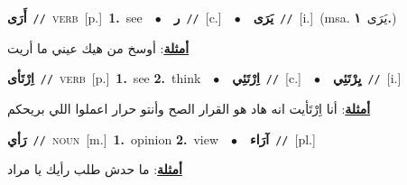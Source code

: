 \documentclass[10pt,a4paper,twoside]{article} %
\begin{document}
\begin{multicols}{2}
{\setlength\topsep{0pt}\textbf{\foreignlanguage{arabic}{أَرَى}}\ {\color{gray}\texttt{//}\color{black}}\ \textsc{verb}\ [p.]\ \textbf{1.}~see\ \ $\bullet$\ \ \setlength\topsep{0pt}\textbf{\foreignlanguage{arabic}{ر}}\ {\color{gray}\texttt{//}\color{black}}\ [c.]\ \ $\bullet$\ \ \setlength\topsep{0pt}\textbf{\foreignlanguage{arabic}{يَرَى}}\ {\color{gray}\texttt{//}\color{black}}\ [i.]\ \color{gray}(msa. \foreignlanguage{arabic}{يَرَى}~\foreignlanguage{arabic}{\textbf{١.}})\color{black}\  \begin{flushright}\color{gray}\foreignlanguage{arabic}{\textbf{\underline{\foreignlanguage{arabic}{أمثلة}}}: أوسخ من هيك عيني ما أريت}\end{flushright}\color{black}} \vspace{2mm}

{\setlength\topsep{0pt}\textbf{\foreignlanguage{arabic}{اِرْتَأى}}\ {\color{gray}\texttt{//}\color{black}}\ \textsc{verb}\ [p.]\ \textbf{1.}~see  \textbf{2.}~think\ \ $\bullet$\ \ \setlength\topsep{0pt}\textbf{\foreignlanguage{arabic}{اِرْتَئِي}}\ {\color{gray}\texttt{//}\color{black}}\ [c.]\ \ $\bullet$\ \ \setlength\topsep{0pt}\textbf{\foreignlanguage{arabic}{يِرْتَئِي}}\ {\color{gray}\texttt{//}\color{black}}\ [i.]\  \begin{flushright}\color{gray}\foreignlanguage{arabic}{\textbf{\underline{\foreignlanguage{arabic}{أمثلة}}}: أنا اِرْتَأيت انه هاد هو القرار الصح وأنتو حرار اعملوا اللي بريحكم}\end{flushright}\color{black}} \vspace{2mm}

{\setlength\topsep{0pt}\textbf{\foreignlanguage{arabic}{رَأي}}\ {\color{gray}\texttt{//}\color{black}}\ \textsc{noun}\ [m.]\ \textbf{1.}~opinion  \textbf{2.}~view\ \ $\bullet$\ \ \setlength\topsep{0pt}\textbf{\foreignlanguage{arabic}{آرَاء}}\ {\color{gray}\texttt{//}\color{black}}\ [pl.]\  \begin{flushright}\color{gray}\foreignlanguage{arabic}{\textbf{\underline{\foreignlanguage{arabic}{أمثلة}}}: ما حدش طلب رأيك يا مراد}\end{flushright}\color{black}} \vspace{2mm}


\end{multicols}
\end{document}
